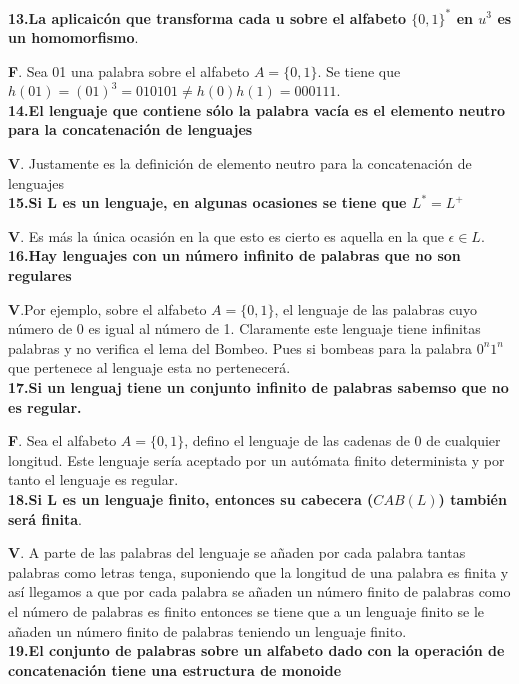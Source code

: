 \documentclass[a4paper,11pt]{article}
\begin{document}
\textbf{13.La aplicaicón que transforma cada u sobre el alfabeto $\{0,1\}^*$ en $u^3$ es un homomorfismo}.

\textbf{F}. Sea 01 una palabra sobre el alfabeto $A=\{0,1\}$. Se tiene que $h(01)=(01)^3=010101\neq h(0)h(1)=000111$. \\

\textbf{14.El lenguaje que contiene sólo la palabra vacía es el elemento neutro para la concatenación de lenguajes}

\textbf{V}. Justamente es la definición de elemento neutro para la concatenación de lenguajes \\

\textbf{15.Si L es un lenguaje, en algunas ocasiones se tiene que $L^*=L^+$}

\textbf{V}. Es más la única ocasión en la que esto es cierto es aquella en la que $\epsilon \in L$.  \\

\textbf{16.Hay lenguajes con un número infinito de palabras que no son regulares}

\textbf{V}.Por ejemplo, sobre el alfabeto $A=\{0,1\}$, el lenguaje de las palabras cuyo número de 0 es igual al número de 1. Claramente este lenguaje tiene infinitas palabras y no verifica el lema del Bombeo. Pues si bombeas para la palabra $0^n1^n$ que pertenece al lenguaje esta no pertenecerá. \\

\textbf{17.Si un lenguaj tiene un conjunto infinito de palabras sabemso que no es regular.}

\textbf{F}. Sea el alfabeto $A=\{0,1\}$, defino el lenguaje de las cadenas de 0 de cualquier longitud. Este lenguaje sería aceptado por un autómata finito determinista y por tanto el lenguaje es regular. \\

\textbf{18.Si L es un lenguaje finito, entonces su cabecera ($CAB(L)$) también será finita}.

\textbf{V}. A parte de las palabras del lenguaje se añaden por cada palabra tantas palabras como letras tenga, suponiendo que la longitud de una palabra es finita y así llegamos a que por cada palabra se añaden un número finito de palabras como el número de palabras es finito entonces se tiene que a un lenguaje finito se le añaden un número finito de palabras teniendo un lenguaje finito. \\

\textbf{19.El conjunto de palabras sobre un alfabeto dado con la operación de concatenación tiene una estructura de monoide}
\end{document}
